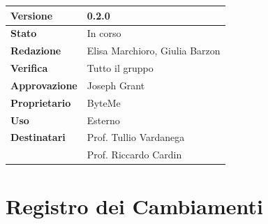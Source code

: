 \documentclass[11pt,a4paper]{article}
\begin{document}
\begin{titlepage}
    \begin{table}[H]
        \centering
        \begin{tabular}{|l|p{5cm}|}
            \hline
            \textbf{Versione} & 0.2.0 \\
            \hline
            \textbf{Stato} & In corso \\
            \hline
            \textbf{Redazione} & Elisa Marchioro, Giulia Barzon \\
            \hline
            \textbf{Verifica} & Tutto il gruppo  \\
            \hline
            \textbf{Approvazione} & Joseph Grant \\
            \hline
            \textbf{Proprietario} & ByteMe \\
            \hline
            \textbf{Uso} & Esterno \\
            \hline
            \textbf{Destinatari} & Prof. Tullio Vardanega \\ & Prof. Riccardo Cardin \\
            \hline
        \end{tabular}
    \end{table}
    
    \vfill
\end{titlepage}

\thispagestyle{empty}
\section*{Registro dei Cambiamenti}
\end{document}
